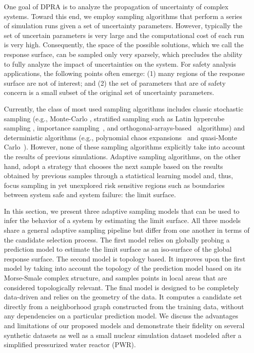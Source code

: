 One goal of DPRA is to analyze the propagation of uncertainty of complex systems.
%
Toward this end, we employ sampling algorithms that perform a series of simulation runs given a set of uncertainty parameters.
%
However, typically the set of uncertain parameters is very large and the computational cost of each run is very high.
%
Consequently, the space of the possible solutions, which we call the response surface, can be sampled only very sparsely, which precludes the ability to fully analyze the impact of uncertainties on the system.
%
For safety analysis applications, the following points often emerge: (1) many regions of the response surface are not of interest; and (2) the set of parameters that are of safety concern is a small subset of the original set of uncertainty parameters.

Currently, the class of most used sampling algorithms includes classic stochastic sampling (e.g., Monte-Carlo \cite{Hastings1970,Liu2001}, stratified sampling such as Latin hypercube sampling \cite{HeltonDavis2003}, importance sampling~\cite{Geweke1989}, and orthogonal-arrays-based~\cite{Owen1992} algorithms) and deterministic algorithms (e.g., polynomial chaos expansions~\cite{Najm2009} and quasi-Monte Carlo~\cite{Caflisch1998}).
%
However, none of these sampling algorithms explicitly take into account the results of previous simulations.
%
Adaptive sampling algorithms, on the other hand, adopt a strategy that chooses the next sample based on the results obtained by previous samples through a statistical learning model and, thus, focus sampling in yet unexplored risk sensitive regions such as boundaries between system safe and system failure: the limit surface.

In this section, we present three adaptive sampling models that can be used to infer the behavior of a system by estimating the limit surface.
%
All three models share a general adaptive sampling pipeline but differ from one another in terms of the candidate selection process.
%
The first model relies on globally probing a prediction model to estimate the limit surface as an iso-surface of the global response surface.
%
The second model is topology based.
%
It improves upon the first model by taking into account the topology of the prediction model based on its Morse-Smale complex structure, and samples points in local areas that are considered topologically relevant.
%
The final model is designed to be completely data-driven and relies on the geometry of the data. It computes a candidate set directly from a neighborhood graph constructed from the training data, without any dependencies on a particular prediction model.
%
We discuss the advantages and limitations of our proposed models and demonstrate their fidelity on several synthetic datasets as well as a small nuclear simulation dataset modeled after a simplified pressurized water reactor (PWR).

